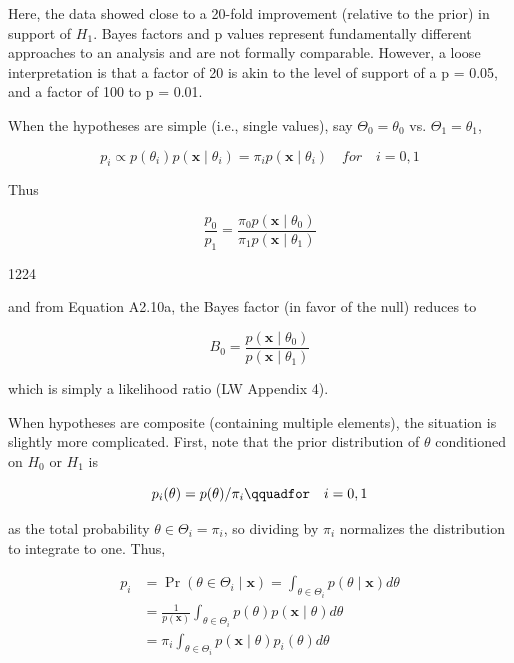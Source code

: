 \documentclass{article}
\begin{document}
Here, the data showed close to a 20-fold improvement (relative to the prior) in support of  $ H_{1} $. Bayes factors and p values represent fundamentally different approaches to an analysis and are not formally comparable. However, a loose interpretation is that a factor of 20 is akin to the level of support of a p = 0.05, and a factor of 100 to p = 0.01.

When the hypotheses are simple (i.e., single values), say  $ \Theta_0 = \theta_0 $ vs.  $ \Theta_1 = \theta_1 $,

\begin{equation}
p_{i}\propto p(\theta_{i})p(\mathbf{x}\mid\theta_{i})=\pi_{i}p(\mathbf{x}\mid\theta_{i})\quad for\quad i=0,1
\end{equation}

Thus

\begin{equation}
\frac{p_{0}}{p_{1}}=\frac{\pi_{0}p(\mathbf{x}\mid\theta_{0})}{\pi_{1}p(\mathbf{x}\mid\theta_{1})}
\end{equation}

1224

and from Equation A2.10a, the Bayes factor (in favor of the null) reduces to

\begin{equation}
B_{0}=\frac{p(\mathbf{x}\mid\theta_{0})}{p(\mathbf{x}\mid\theta_{1})}
\end{equation}

which is simply a likelihood ratio (LW Appendix 4).

When hypotheses are composite (containing multiple elements), the situation is slightly more complicated. First, note that the prior distribution of  $ \theta $ conditioned on  $ H_0 $ or  $ H_1 $ is

\begin{equation}
p_{i}(\theta)=p(\theta)/\pi_{i}\qquadfor\quad i=0,1
\end{equation}

as the total probability  $ \theta \in \Theta_i = \pi_i $, so dividing by  $ \pi_i $ normalizes the distribution to integrate to one. Thus,

\begin{equation}
\begin{aligned}p_{i}&=\Pr(\theta\in\Theta_{i}\mid\mathbf{x})=\int_{\theta\in\Theta_{i}}p(\theta\mid\mathbf{x})d\theta\\&=\frac{1}{p(\mathbf{x})}\int_{\theta\in\Theta_{i}}p(\theta)p(\mathbf{x}\mid\theta)d\theta\\&=\pi_{i}\int_{\theta\in\Theta_{i}}p(\mathbf{x}\mid\theta)p_{i}(\theta)d\theta\\ \end{aligned}
\end{equation}
\end{document}
